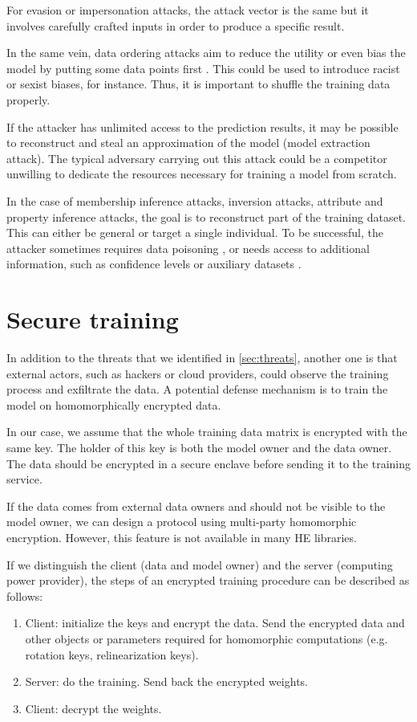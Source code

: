 \documentclass[a4paper,11pt,oneside]{report}
\begin{document}
For evasion or impersonation attacks, the attack vector is the same but it involves carefully crafted inputs in order to produce a specific result. 

In the same vein, data ordering attacks aim to reduce the utility or even bias the model by putting some data points first \cite{shumailov_manipulating_2021}. 
This could be used to introduce racist or sexist biases, for instance. Thus, it is important to shuffle the training data properly.

If the attacker has unlimited access to the prediction results, it may be possible to reconstruct and steal an approximation of the model (model extraction attack). 
The typical adversary carrying out this attack could be a competitor unwilling to dedicate the resources necessary for training a model from scratch.

In the case of membership inference attacks, inversion attacks, attribute and property inference attacks, the goal is to reconstruct part of the training dataset. 
This can either be general or target a single individual. To be successful, the attacker sometimes requires data poisoning \cite{hidano_model_2017}, or needs access to additional information, such as confidence levels or auxiliary datasets \cite{fredrikson_model_2015, wang_variational_2022}.


\section{Secure training}\label{sec:secure_training}

In addition to the threats that we identified in \autoref{sec:threats}, another one is that external actors, such as hackers or cloud providers, could observe the training process and exfiltrate the data. 
A potential defense mechanism is to train the model on homomorphically encrypted data.

In our case, we assume that the whole training data matrix is encrypted with the same key. 
The holder of this key is both the model owner and the data owner. 
The data should be encrypted in a secure enclave before sending it to the training service. 

If the data comes from external data owners and should not be visible to the model owner, we can design a protocol using multi-party homomorphic encryption. 
However, this feature is not available in many HE libraries.

If we distinguish the client (data and model owner) and the server (computing power provider), the steps of an encrypted training procedure can be described as follows:
\begin{enumerate}
    \item Client: initialize the keys and encrypt the data. Send the encrypted data and other objects or parameters required for homomorphic computations (e.g. rotation keys, relinearization keys).
    \item Server: do the training. Send back the encrypted weights.
    \item Client: decrypt the weights.
\end{enumerate}
\end{document}
